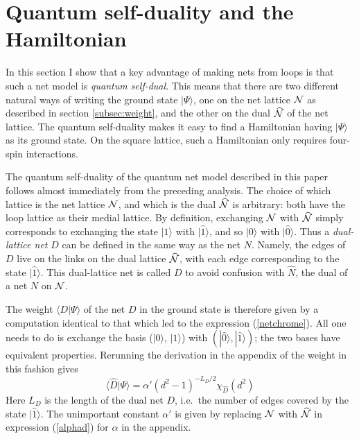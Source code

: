 \documentclass[11pt]{article}
\newcommand{\wwr}{|\widehat{0}\rangle}
\newcommand{\xxr}{|\widehat{1}\rangle}
\newcommand{\Nhat}{\widehat{\cal N}}
\begin{document}
\section{Quantum self-duality and the Hamiltonian}
\label{sec:selfdual}

In this section I show that a key advantage of making nets from loops
is that such a net model is {\em quantum self-dual}. This means that
there are two different natural ways of writing the ground state
$|\Psi\rangle$, one on the net lattice ${\cal N}$ as described in
section \ref{subsec:weight}, and the other on the dual 
$\widehat{\cal N}$ of the net lattice. The quantum self-duality makes it
easy to find a Hamiltonian having $|\Psi\rangle$ as its ground
state. On the square lattice, such a Hamiltonian only requires
four-spin interactions.



The quantum self-duality of the quantum net model described in this
paper follows almost immediately from the preceding analysis.  The
choice of which lattice is the net lattice ${\cal N}$, and which is
the dual $\widehat{\cal N}$ is arbitrary: both have the
loop lattice as their medial lattice. By definition, exchanging ${\cal
N}$ with $\Nhat$ simply corresponds to exchanging the state $|1\rangle$
with $\xxr$, and so $|0\rangle$ with $\wwr$. Thus a {\em dual-lattice
net} $D$ can be defined in the same way as the net $N$. Namely, the
edges of $D$ live on the links on the dual lattice $\Nhat$, with each
edge corresponding to the state $\xxr$.  This dual-lattice net is
called $D$ to avoid confusion with $\widehat N$, the dual of a net $N$
on ${\cal N}$. 


The weight $\langle D|\Psi\rangle$ of the net $D$ in the ground state
is therefore given by a computation identical to that which led to 
the expression (\ref{netchrome}). All one needs to do is exchange the
basis ($|0\rangle$, $|1\rangle$) with $(\wwr,\xxr)$; the two 
bases have equivalent properties. Rerunning the 
derivation in the appendix of the weight in this fashion gives
\begin{equation}
\langle \widehat{D} | \Psi\rangle = \alpha'
\left(
{{d^2-1}}\right)^{-L_D/2}
\chi_{\widehat{D}}(d^2)
\label{PsiNdual}
\end{equation}
Here $L_D$ is the length of the dual net $D$, i.e.\ the number of edges
covered by the state $\xxr$. The unimportant constant $\alpha'$ is
given by replacing ${\cal N}$ with $\Nhat$ in 
expression (\ref{alphad}) for $\alpha$ in the appendix.
\end{document}
